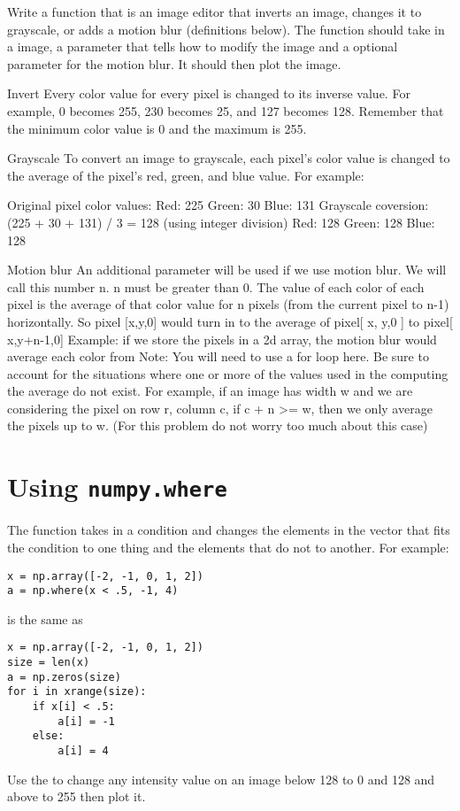 \begin{problem}
Write a function that is an image editor that inverts an image, changes it to grayscale, 
or adds a motion blur (definitions below). 
The function should take in a image, a parameter that tells how to modify the image 
and a optional parameter for the motion blur. It should then plot the image. 
\end{problem}

Invert
Every color value for every pixel is changed to its inverse value. For example, 0 
becomes 255, 230 becomes 25, and 127 becomes 128. Remember that the minimum 
color value is 0 and the maximum is 255.

Grayscale
To convert an image to grayscale, each pixel’s color value is changed to the average of 
the pixel’s red, green, and blue value. For example:

Original pixel color values:
Red: 225 Green: 30 Blue: 131
Grayscale coversion: (225 + 30 + 131) / 3 = 128 (using integer division)
Red: 128 Green: 128 Blue: 128

Motion blur
An additional parameter will be used if we use motion blur. We will call this number n. n must be greater than 0.
The value of each color of each pixel is the average of that color value for n pixels (from 
the current pixel to n-1) horizontally. So pixel [x,y,0] would turn in to the average of
pixel[ x, y,0 ] to pixel[ x,y+n-1,0] 
Example: if we store the pixels in a 2d array, the motion blur would average each color 
from Note: You will need to use a for loop here.
Be sure to account for the situations where one or more of the values used in the 
computing the average do not exist. For example, if an image has width w and we are 
considering the pixel on row r, column c, if c + n >= w, then we only average the pixels 
up to w. (For this problem do not worry too much about this case)

\section*{Using \texttt{numpy.where}}
The  function takes in a condition and changes the elements in the 
vector that fits the condition to one thing and the elements that do not to another. 
For example:
\begin{lstlisting}
x = np.array([-2, -1, 0, 1, 2])
a = np.where(x < .5, -1, 4)
\end{lstlisting}
is the same as
\begin{lstlisting}
x = np.array([-2, -1, 0, 1, 2])
size = len(x)
a = np.zeros(size)
for i in xrange(size):
    if x[i] < .5:
        a[i] = -1
    else:
        a[i] = 4
\end{lstlisting}

\begin{problem}
Use the  to change any intensity value on an image below 128 to 0 and 128 and above to 255 then plot it.
\end{problem}
